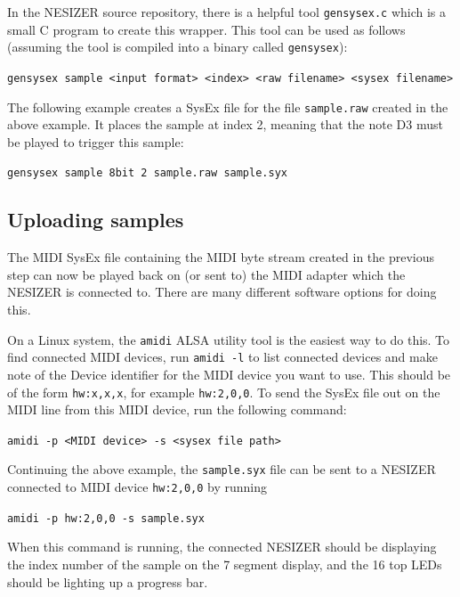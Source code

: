 \documentclass[a4paper, 12p]{extarticle}
\begin{document}
In the NESIZER source repository, there is a helpful tool \verb+gensysex.c+ which is a small C program to create this wrapper. This tool can be used as follows (assuming the tool is compiled into a binary called \verb+gensysex+):

\verb+gensysex sample <input format> <index> <raw filename> <sysex filename>+

The following example creates a SysEx file for the file \verb+sample.raw+ created in the above example. It places the sample at index 2, meaning that the note D3 must be played to trigger this sample:

\verb+gensysex sample 8bit 2 sample.raw sample.syx+

\subsection{Uploading samples}
The MIDI SysEx file containing the MIDI byte stream created in the previous step can now be played back on (or sent to) the MIDI adapter which the NESIZER is connected to. There are many different software options for doing this.

On a Linux system, the \verb+amidi+ ALSA utility tool is the easiest way to do this. To find connected MIDI devices, run \verb+amidi -l+ to list connected devices and make note of the Device identifier for the MIDI device you want to use. This should be of the form \verb+hw:x,x,x+, for example \verb+hw:2,0,0+.
To send the SysEx file out on the MIDI line from this MIDI device, run the following command:

\verb+amidi -p <MIDI device> -s <sysex file path>+

Continuing the above example, the \verb+sample.syx+ file can be sent to a NESIZER connected to MIDI device \verb+hw:2,0,0+ by running

\verb+amidi -p hw:2,0,0 -s sample.syx+

When this command is running, the connected NESIZER should be displaying the index number of the sample on the 7 segment display, and the 16 top LEDs should be lighting up a progress bar.
\end{document}
